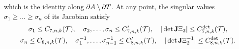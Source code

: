 \documentclass[10pt,a4paper]{article}
\begin{document}
\begin{proposition}
\begin{enumerate}
    which is the identity along $\partial A \setminus \partial T$.
    At any point, the singular values $\sigma_1 \geq \dots \geq \sigma_n$ of its Jacobian satisfy 
    \begin{gather*}
        \sigma_1 \leq C_{7,n,k}({\mathcal T}),
        \quad 
        \sigma_2,\dots,\sigma_n \leq C'_{7,n,k}({\mathcal T}),
        \quad 
        | \det{\mathbf{J}}\Xi_{2} |      \leq C^{\det}_{7,n,k}({\mathcal T}),
        \\
        \sigma_n \leq C_{8,n,k}({\mathcal T}),
        \quad 
        \sigma_1^{-1},\dots,\sigma_{n-1}^{-1} \leq C'_{8,n,k}({\mathcal T}),
        \quad 
        | \det{\mathbf{J}}\Xi_{2}^{-1} | \leq C^{\det}_{8,n,k}({\mathcal T}).
    \end{gather*}
    \end{enumerate}
\end{proposition}
\end{document}
